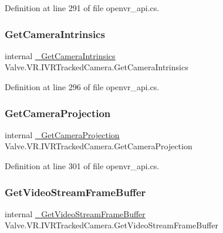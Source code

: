 Definition at line 291 of file openvr\+\_\+api.\+cs.

\mbox{\label{struct_valve_1_1_v_r_1_1_i_v_r_tracked_camera_a81e3d529a4935d87bc3585be53ed51fd}} 
\subsubsection{\texorpdfstring{GetCameraIntrinsics}{GetCameraIntrinsics}}
{\footnotesize\ttfamily internal \mbox{\hyperlink{struct_valve_1_1_v_r_1_1_i_v_r_tracked_camera_aacef66b75e9aea2e3f8e98c36f7f8c9a}{\+\_\+\+Get\+Camera\+Intrinsics}} Valve.\+V\+R.\+I\+V\+R\+Tracked\+Camera.\+Get\+Camera\+Intrinsics}



Definition at line 296 of file openvr\+\_\+api.\+cs.

\mbox{\label{struct_valve_1_1_v_r_1_1_i_v_r_tracked_camera_a023d1a201789c221dbaa7286fa8710b9}} 
\subsubsection{\texorpdfstring{GetCameraProjection}{GetCameraProjection}}
{\footnotesize\ttfamily internal \mbox{\hyperlink{struct_valve_1_1_v_r_1_1_i_v_r_tracked_camera_a8c5bac72968c107773b0f8e5dc1b1bf1}{\+\_\+\+Get\+Camera\+Projection}} Valve.\+V\+R.\+I\+V\+R\+Tracked\+Camera.\+Get\+Camera\+Projection}



Definition at line 301 of file openvr\+\_\+api.\+cs.

\mbox{\label{struct_valve_1_1_v_r_1_1_i_v_r_tracked_camera_a21af5b8ca53bc1c537a171b8e67e3545}} 
\subsubsection{\texorpdfstring{GetVideoStreamFrameBuffer}{GetVideoStreamFrameBuffer}}
{\footnotesize\ttfamily internal \mbox{\hyperlink{struct_valve_1_1_v_r_1_1_i_v_r_tracked_camera_afdef1fed34343a2452be09cbe044d9ed}{\+\_\+\+Get\+Video\+Stream\+Frame\+Buffer}} Valve.\+V\+R.\+I\+V\+R\+Tracked\+Camera.\+Get\+Video\+Stream\+Frame\+Buffer}



